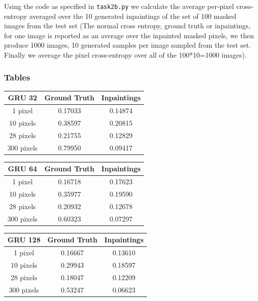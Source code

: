 \documentclass{article}
\begin{document}
Using the code as specified in \texttt{task2b.py} we calculate the average
per-pixel cross-entropy averaged over the 10 generated inpaintings of the set of
100 masked images from the test set (The normal cross entropy, ground truth or
inpaintings, for one image is reported as an average over the inpainted masked
pixels, we then produce 1000 images, 10 generated samples per image sampled from
the test set. Finally we average the pixel cross-entropy over all of the
100*10=1000 images).

\subsubsection{Tables}

\begin{center}
  \begin{tabular}{ |c|c|c| } 
    \hline
    GRU 32 & Ground Truth & Inpaintings \\
    \hline
    1 pixel & 0.17033 & 0.14874 \\
    10 pixels & 0.38597 & 0.20815 \\
    28 pixels & 0.21755 & 0.12829 \\
    300 pixels & 0.79950 & 0.09417 \\
    \hline
  \end{tabular}
\end{center}

\begin{center}
  \begin{tabular}{ |c|c|c| } 
    \hline
    GRU 64 & Ground Truth & Inpaintings \\
    \hline
    1 pixel & 0.16718 & 0.17623 \\
    10 pixels & 0.35977 & 0.19590 \\
    28 pixels & 0.20932 & 0.12678 \\
    300 pixels & 0.60323 & 0.07297 \\
    \hline
  \end{tabular}
\end{center}

\begin{center}
  \begin{tabular}{ |c|c|c| } 
    \hline
    GRU 128 & Ground Truth & Inpaintings \\
    \hline
    1 pixel & 0.16667 & 0.13610 \\
    10 pixels & 0.29943 & 0.18597 \\
    28 pixels & 0.18047 & 0.12209\\
    300 pixels & 0.53247 & 0.06623 \\
    \hline
  \end{tabular}
\end{center}
\end{document}
